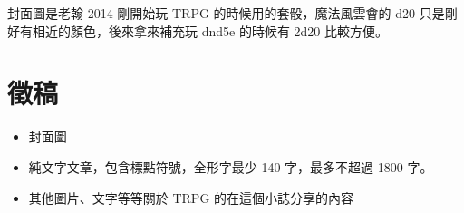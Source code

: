 \documentclass[10pt, a5paper]{article}
\newcommand{\attrib}[1]{%
\nopagebreak{\raggedleft\footnotesize #1\par}}
\begin{document}
\begin{CJK}{UTF8}{bsmi}
\vfill
\pagebreak


封面圖是老翰 2014 剛開始玩 TRPG 的時候用的套骰，魔法風雲會的 d20 只是剛好有相近的顏色，後來拿來補充玩 dnd5e 的時候有 2d20 比較方便。

\section{徵稿}

\begin{itemize}
  \item 封面圖
  \item 純文字文章，包含標點符號，全形字最少 140 字，最多不超過 1800 字。
  \item 其他圖片、文字等等關於 TRPG 的在這個小誌分享的內容
\end{itemize}



\vfill
\contactmethod
\pagebreak

\end{CJK}
\end{document}

